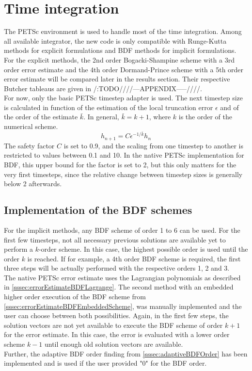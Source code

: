 \section{Time integration}
The PETSc environment is used to handle most of the time integration. Among all available integrator, the new code is only compatible with Runge-Kutta methods for explicit formulations and BDF methods for implicit formulations. \\
For the explicit methods, the 2nd order Bogacki-Shampine scheme with a 3rd order error estimate and the 4th order Dormand-Prince scheme with a 5th order error estimate will be compared later in the results section. Their respective Butcher tableaus are given in /:TODO////---APPENDIX-----////. \\
For now, only the basic PETSc timestep adapter is used. The next timestep size is calculated in function of the estimation of the local truncation error $\epsilon$ and of the order of the estimate $\bar{k}$. In general, $\bar{k}=k+1$, where $k$ is the order of the numerical scheme. 
\begin{equation}
	h_{n+1} = C\epsilon^{-1/\bar{k}}h_n
\end{equation}
The safety factor $C$ is set to 0.9, and the scaling from one timestep to another is restricted to values between 0.1 and 10. In the native PETSc implementation for BDF, this upper bound for the factor is set to 2, but this only matters for the very first timesteps, since the relative change between timestep sizes is generally below 2 afterwards.

\subsection{Implementation of the BDF schemes}
For the implicit methods, any BDF scheme of order 1 to 6 can be used. For the first few timesteps, not all necessary previous solutions are available yet to perform a $k$-order scheme. In this case, the highest possible order is used until the order $k$ is reached. If for example, a 4th order BDF scheme is required, the first three steps will be actually performed with the respective orders 1, 2 and 3. \\
The native PETSc error estimate uses the Lagrangian polynomials as described in \autoref{sssec:errorEstimateBDFLagrange}. The second method with an embedded higher order execution of the BDF scheme from \autoref{sssec:errorEstimateBDFEmbeddedScheme}, was manually implemented and the user can choose between both possibilities. Again, in the first few steps, the solution vectors are not yet available to execute the BDF scheme of order $k+1$ for the error estimate. In this case, the error is evaluated with a lower order scheme $k-1$ until enough old solution vectors are available. \\
Further, the adaptive BDF order finding from \autoref{sssec:adaptiveBDFOrder} has been implemented and is used if the user provided "0" for the BDF order. 

